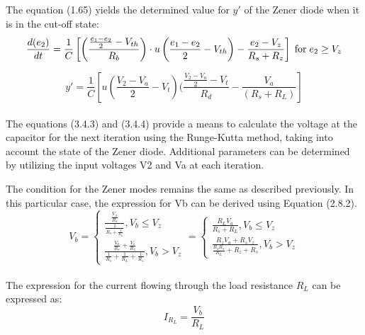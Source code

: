 The equation (1.65) yields the determined value for $y'$ of the Zener diode when it is in the cut-off state:\\

\begin{equation}
    \frac{d(e_2)}{dt}=\frac{1}{C}\left[\left(\frac{\frac{e_1 - e_2}{2} - V_{th}}{R_b} \right)\cdot u\left(\frac{e_1 - e_2}{2} - V_{th} \right)-\frac{e_2-V_z}{R_s+R_z} \right] \hspace{0.1cm} \text{for} \hspace{0.1cm} e_2 \geq V_z
\end{equation}

\begin{equation}
    y'=\frac{1}{C}[u(\frac{V_2-V_a}{2}-V_t)(\frac{\frac{V_2-V_a}{2}-V_t}{R_d}-\frac{V_a}{(R_s+R_L)}]
\end{equation}\\

The equations (3.4.3) and (3.4.4) provide a means to calculate the voltage at the capacitor for the next iteration using the Runge-Kutta method, taking into account the state of the Zener diode. Additional parameters can be determined by utilizing the input voltages V2 and Va at each iteration.

The condition for the Zener modes remains the same as described previously. In this particular case, the expression for Vb can be derived using Equation (2.8.2).\\

\begin{equation}
    V_b=\begin{cases}
        \frac{\frac{V_a}{R_s}}{\frac{1}{R_s+\frac{1}{R_L}}}, V_b \leq V_z\\
        \frac{\frac{V_a}{R_s}+\frac{V_z}{R_z}}{\frac{1}{R_s}+\frac{1}{R_L}+\frac{1}{R_z}}, V_b>V_z
    \end{cases}=\begin{cases}
        \frac{R_LV_a}{R_s+R_L}, V_b \leq V_z\\
        \frac{R_zV_a+R_sV_z}{\frac{R_zR_s}{R_L}+R_z+R_s}, V_b>V_z
    \end{cases}
\end{equation}\\

The expression for the current flowing through the load resistance $R_L$ can be expressed as:\\

\begin{equation}
    I_{R_L}=\frac{V_b}{R_L}
\end{equation}\\

